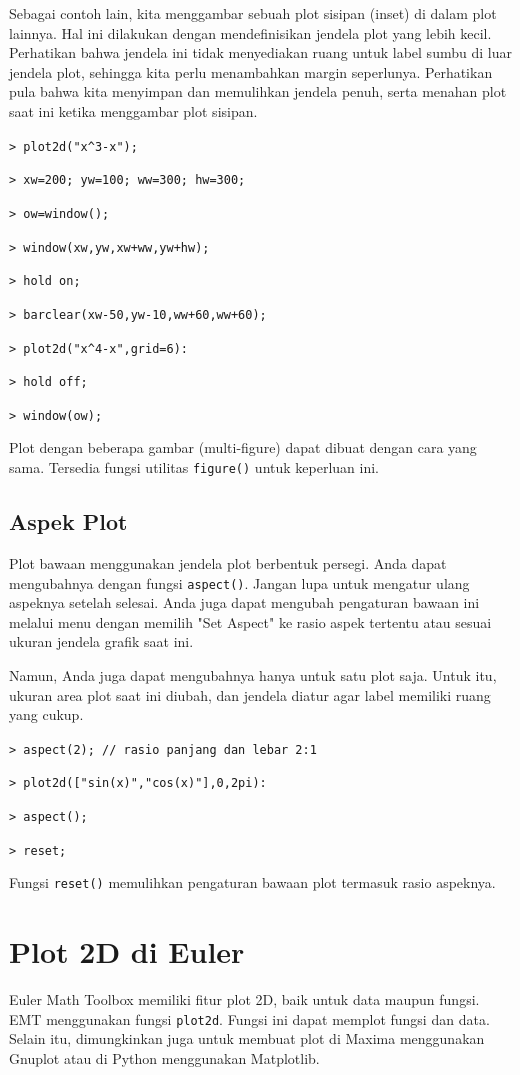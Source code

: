 \documentclass[11pt, a4paper]{article}
\newcommand{\emtcmd}[1]{\noindent\texttt{\textcolor{emtcommand}{>}\ #1}\par\smallskip}
\begin{document}
Sebagai contoh lain, kita menggambar sebuah plot sisipan (inset) di dalam plot lainnya. Hal ini dilakukan dengan mendefinisikan jendela plot yang lebih kecil. Perhatikan bahwa jendela ini tidak menyediakan ruang untuk label sumbu di luar jendela plot, sehingga kita perlu menambahkan margin seperlunya. Perhatikan pula bahwa kita menyimpan dan memulihkan jendela penuh, serta menahan plot saat ini ketika menggambar plot sisipan.

\emtcmd{plot2d("x\^{}3-x");}
\emtcmd{xw=200; yw=100; ww=300; hw=300;}
\emtcmd{ow=window();}
\emtcmd{window(xw,yw,xw+ww,yw+hw);}
\emtcmd{hold on;}
\emtcmd{barclear(xw-50,yw-10,ww+60,ww+60);}
\emtcmd{plot2d("x\^{}4-x",grid=6):}
\emtcmd{hold off;}
\emtcmd{window(ow);}

Plot dengan beberapa gambar (multi-figure) dapat dibuat dengan cara yang sama. Tersedia fungsi utilitas \texttt{figure()} untuk keperluan ini.

\subsection*{Aspek Plot}

Plot bawaan menggunakan jendela plot berbentuk persegi. Anda dapat mengubahnya dengan fungsi \texttt{aspect()}. Jangan lupa untuk mengatur ulang aspeknya setelah selesai. Anda juga dapat mengubah pengaturan bawaan ini melalui menu dengan memilih "Set Aspect" ke rasio aspek tertentu atau sesuai ukuran jendela grafik saat ini.

Namun, Anda juga dapat mengubahnya hanya untuk satu plot saja. Untuk itu, ukuran area plot saat ini diubah, dan jendela diatur agar label memiliki ruang yang cukup.

\emtcmd{aspect(2); \textcolor{emtcomment}{// rasio panjang dan lebar 2:1}}
\emtcmd{plot2d(["sin(x)","cos(x)"],0,2pi):}
\emtcmd{aspect();}
\emtcmd{reset;}

Fungsi \texttt{reset()} memulihkan pengaturan bawaan plot termasuk rasio aspeknya.

\section*{Plot 2D di Euler}

Euler Math Toolbox memiliki fitur plot 2D, baik untuk data maupun fungsi. EMT menggunakan fungsi \texttt{plot2d}. Fungsi ini dapat memplot fungsi dan data. Selain itu, dimungkinkan juga untuk membuat plot di Maxima menggunakan Gnuplot atau di Python menggunakan Matplotlib.
\end{document}
